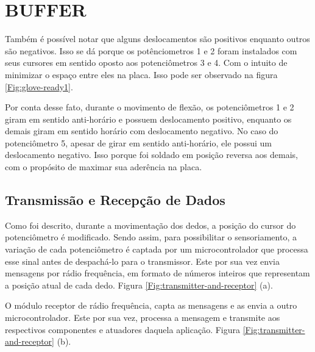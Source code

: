 \documentclass[
	12pt,				%
	openright,			%
	oneside,			%
	a4paper,			%
	english,			%
	brazil				%
	]{abntex2}
\begin{document}
		\chapter{BUFFER}
		Também é possível notar que alguns deslocamentos são positivos enquanto outros são negativos. Isso se dá porque os potênciometros 1 e 2 foram instalados com seus cursores em sentido oposto aos potenciômetros 3 e 4. Com o intuito de minimizar o espaço entre eles na placa. Isso pode ser observado na figura \ref{Fig:glove-ready1}.

		Por conta desse fato, durante o movimento de flexão, os potenciômetros 1 e 2 giram em sentido anti-horário e possuem deslocamento positivo, enquanto os demais giram em sentido horário com deslocamento negativo. No caso do potenciômetro 5, apesar de girar em sentido anti-horário, ele possui um deslocamento negativo. Isso porque foi soldado em posição reversa aos demais, com o propósito de maximar sua aderência na placa.




		\section{Transmissão e Recepção de Dados}

			Como foi descrito, durante a movimentação dos dedos, a posição do cursor do potenciômetro é modificado. Sendo assim, para possibilitar o sensoriamento, a variação de cada potenciômetro é captada por um microcontrolador que processa esse sinal antes de despachá-lo para o transmissor. Este por sua vez envia mensagens por rádio frequência, em formato de números inteiros que representam a posição atual de cada dedo. Figura \ref{Fig:transmitter-and-receptor} (a).

			O módulo receptor de rádio frequência, capta as mensagens e as envia a outro microcontrolador. Este por sua vez, processa a mensagem e transmite aos respectivos componentes e atuadores daquela aplicação. Figura \ref{Fig:transmitter-and-receptor} (b).
\end{document}
